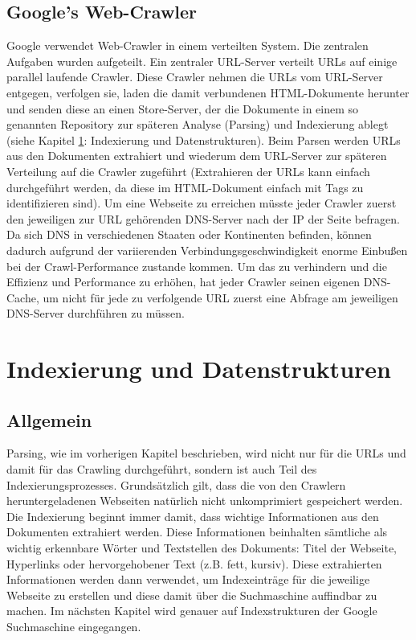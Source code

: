 \documentclass[12pt, a4paper]{llncs}
\begin{document}
	\subsection{Google's Web-Crawler}
	Google verwendet Web-Crawler in einem verteilten System. Die zentralen Aufgaben wurden aufgeteilt. Ein zentraler URL-Server
	verteilt URLs auf einige parallel laufende Crawler. Diese Crawler nehmen die URLs vom URL-Server entgegen, verfolgen sie,
	laden die damit verbundenen HTML-Dokumente herunter und senden diese an einen Store-Server, der die Dokumente in einem so
	genannten Repository zur späteren Analyse (Parsing) und Indexierung ablegt (siehe Kapitel \ref{indexDat}: Indexierung und Datenstrukturen).
	Beim Parsen werden URLs aus den Dokumenten extrahiert und wiederum dem URL-Server zur späteren Verteilung auf die Crawler
	zugeführt (Extrahieren der URLs kann einfach durchgeführt werden, da diese im HTML-Dokument einfach mit Tags zu identifizieren
	sind).
	Um eine Webseite zu erreichen müsste jeder Crawler zuerst den jeweiligen zur URL gehörenden DNS-Server nach der IP der Seite befragen.
	Da sich DNS in verschiedenen Staaten oder Kontinenten befinden, können dadurch aufgrund der variierenden Verbindungsgeschwindigkeit enorme
	Einbußen bei der Crawl-Performance zustande kommen.
	Um das zu verhindern und die Effizienz und Performance zu erhöhen, hat jeder Crawler seinen eigenen DNS-Cache, um nicht für jede zu verfolgende
	URL zuerst eine Abfrage	am jeweiligen DNS-Server durchführen zu müssen.\cite{page98}
	
	
	
	\section{Indexierung und Datenstrukturen}\label{indexDat}
	\subsection{Allgemein}
	Parsing, wie im vorherigen Kapitel beschrieben, wird nicht nur für die URLs und damit für das Crawling durchgeführt, sondern ist auch Teil
	des Indexierungsprozesses. Grundsätzlich gilt, dass die von den Crawlern heruntergeladenen Webseiten natürlich nicht unkomprimiert gespeichert
	werden. Die Indexierung beginnt immer damit, dass wichtige Informationen aus den Dokumenten extrahiert werden. Diese Informationen beinhalten
	sämtliche als wichtig erkennbare Wörter und Textstellen des Dokuments: Titel der Webseite, Hyperlinks oder hervorgehobener Text (z.B. fett, kursiv).
	Diese extrahierten Informationen werden dann verwendet, um Indexeinträge für die jeweilige Webseite zu erstellen und diese damit über die Suchmaschine
	auffindbar zu machen.\cite{langville11}\newline
	Im nächsten Kapitel wird genauer auf Indexstrukturen der Google Suchmaschine eingegangen.\cite{page98}
	
\end{document}
